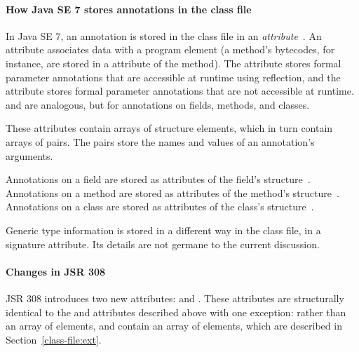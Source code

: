 \documentclass[10pt]{article}
\begin{document}


\paragraph{How Java SE 7 stores annotations in the class file}


In Java SE 7, an annotation is stored in the class file in an
\emph{attribute}~\cite{JSR175,LindholmYBB2012}.  An attribute 
associates data with a program element (a
method's bytecodes, for instance, are stored in a 
attribute of the method). The \RuntimeVisibleParameterAnnotations attribute
stores formal parameter annotations that are accessible at runtime using
reflection, and the
\RuntimeInvisibleParameterAnnotations attribute stores formal parameter annotations
that are not accessible at runtime.
\RuntimeVisibleAnnotations and 
\RuntimeInvisibleAnnotations are analogous, but for annotations on fields,
methods, and classes.

These attributes contain arrays of
 structure elements, which in turn contain arrays of
 pairs.  The  pairs store
the names and values of an annotation's arguments.

Annotations on a field are stored as attributes of the field's 
 structure~\cite[\S 4.6]{LindholmYBB2012}.
Annotations on a method are stored as attributes of the method's
 structure~\cite[\S 4.7]{LindholmYBB2012}.
Annotations on a class are stored as attributes of the class's
 structure~\cite[\S 4.2]{LindholmYBB2012}.

Generic type information is stored in a different way in the class file, in
a signature attribute.  Its details are not germane to the current
discussion.


\paragraph{Changes in JSR 308}
JSR 308 introduces two new attributes:
\RuntimeVisibleTypeAnnotations and
\RuntimeInvisibleTypeAnnotations. These attributes are
structurally identical to the \RuntimeVisibleAnnotations and
\RuntimeInvisibleAnnotations attributes described above with one
exception: rather than an array of  elements,
\RuntimeVisibleTypeAnnotations and
\RuntimeInvisibleTypeAnnotations contain an array of
\extendedannotation elements, which are described in
Section~\ref{class-file:ext}.
\end{document}
